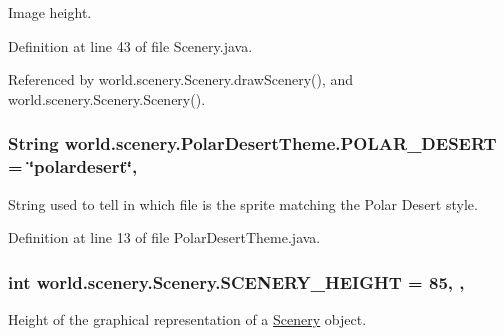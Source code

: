 Image height. 



Definition at line 43 of file Scenery.\-java.



Referenced by world.\-scenery.\-Scenery.\-draw\-Scenery(), and world.\-scenery.\-Scenery.\-Scenery().

\hypertarget{a00019_a48dd1801e0146ea2306dadcbdee81b77}{
\subsubsection[{P\-O\-L\-A\-R\-\_\-\-D\-E\-S\-E\-R\-T}]{\setlength{\rightskip}{0pt plus 5cm}String world.\-scenery.\-Polar\-Desert\-Theme.\-P\-O\-L\-A\-R\-\_\-\-D\-E\-S\-E\-R\-T = \char`\"{}polardesert\char`\"{}\hspace{0.3cm}{\ttfamily [static]}, {\ttfamily [inherited]}}}\label{a00019_a48dd1801e0146ea2306dadcbdee81b77}


String used to tell in which file is the sprite matching the Polar Desert style. 



Definition at line 13 of file Polar\-Desert\-Theme.\-java.

\hypertarget{a00024_a106e53ae6e1647395740237ccce7f363}{
\subsubsection[{S\-C\-E\-N\-E\-R\-Y\-\_\-\-H\-E\-I\-G\-H\-T}]{\setlength{\rightskip}{0pt plus 5cm}int world.\-scenery.\-Scenery.\-S\-C\-E\-N\-E\-R\-Y\-\_\-\-H\-E\-I\-G\-H\-T = 85\hspace{0.3cm}{\ttfamily [static]}, {\ttfamily [protected]}, {\ttfamily [inherited]}}}\label{a00024_a106e53ae6e1647395740237ccce7f363}


Height of the graphical representation of a \hyperlink{a00024}{Scenery} object. 



